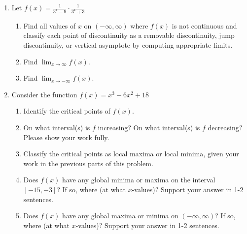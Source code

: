 \documentclass{article}
\begin{document}
\begin{enumerate}
\begin{enumerate}
    Marta's graph of $f'(x)$ is incorrect. Explain why in 1-2 sentences, then describe the features of a possible graph of $f'(x)$. 
    \vfill
\end{enumerate}

\newpage
\item  Let $\displaystyle f(x) = \frac{1}{3^x - 9}\cdot \frac{1}{3^x + 3}$
    \begin{enumerate}
        \item \begin{problem}[\vfill]Find all values of $x$ on $(-\infty, \infty)$ where $f(x)$ is not continuous and classify each point of discontinuity as a removable discontinuity, jump discontinuity, or vertical asymptote by computing appropriate limits.
        \end{problem}
        \item \begin{problem}[\vfill]Find $\displaystyle \lim_{x \to \infty} f(x)$.
        \end{problem}
        \item \begin{problem}[\vfill]Find $\displaystyle \lim_{x \to -\infty} f(x)$.
        \end{problem}
       
    \end{enumerate}

\newpage
\item Consider the function $f(x)=x^3-6x^2+18$
    \begin{enumerate}
        \item \begin{problem}[\vfill]Identify the critical points of $f(x)$.
        \end{problem}
        \item \begin{problem}[\vfill]On what interval(s) is $f$ increasing?
        On what interval(s) is $f$ decreasing? Please show your work fully.
        \end{problem}
        
        \item \begin{problem}[\vfill]Classify the critical points as local maxima or local minima, given your work in the previous parts of this problem.
        \end{problem}

        \newpage
        \item \begin{problem}[\vfill]Does $f(x)$ have any global minima or maxima on the interval $[-15, -3]$? If so, where (at what $x$-values)? Support your answer in 1-2 sentences.
        \end{problem}
        \item \begin{problem}[\vfill]Does $f(x)$ have any global maxima or minima on $(-\infty, \infty)$? If so, where (at what $x$-values)? Support your answer in 1-2 sentences.
        \end{problem}
       

\end{enumerate}
\end{enumerate}
\end{document}
